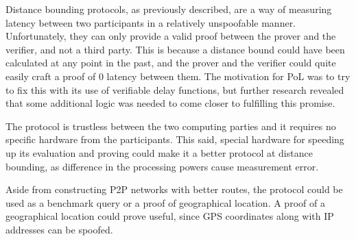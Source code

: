 Distance bounding protocols, as previously described, are a way of measuring latency between two participants in a relatively unspoofable manner. Unfortunately, they can only provide a valid proof between the prover and the verifier, and not a third party. This is because a distance bound could have been calculated at any point in the past, and the prover and the verifier could quite easily craft a proof of 0 latency between them. The motivation for PoL was to try to fix this with its use of verifiable delay functions, but further research revealed that some additional logic was needed to come closer to fulfilling this promise.

The protocol is trustless between the two computing parties and it requires no specific hardware from the participants. This said, special hardware for speeding up its evaluation and proving could make it a better protocol at distance bounding, as difference in the processing powers cause measurement error.

Aside from constructing P2P networks with better routes, the protocol could be used as a benchmark query or a proof of geographical location. A proof of a geographical location could prove useful, since GPS coordinates along with IP addresses can be spoofed.


